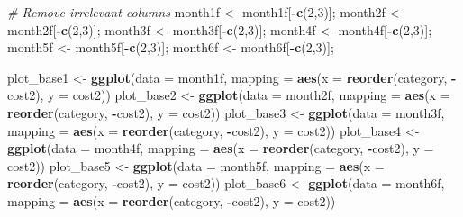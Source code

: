 \documentclass[
]{article}
\newenvironment{Shaded}{\begin{snugshade}}{\end{snugshade}}
\newcommand{\CommentTok}[1]{\textcolor[rgb]{0.56,0.35,0.01}{\textit{#1}}}
\newcommand{\DataTypeTok}[1]{\textcolor[rgb]{0.13,0.29,0.53}{#1}}
\newcommand{\DecValTok}[1]{\textcolor[rgb]{0.00,0.00,0.81}{#1}}
\newcommand{\KeywordTok}[1]{\textcolor[rgb]{0.13,0.29,0.53}{\textbf{#1}}}
\newcommand{\NormalTok}[1]{#1}
\newcommand{\OperatorTok}[1]{\textcolor[rgb]{0.81,0.36,0.00}{\textbf{#1}}}
\newcommand{\StringTok}[1]{\textcolor[rgb]{0.31,0.60,0.02}{#1}}
\begin{document}
\begin{Shaded}
\begin{Highlighting}[]
\CommentTok{# Remove irrelevant columns}
\NormalTok{ month1f <-}\StringTok{ }\NormalTok{month1f[}\OperatorTok{-}\KeywordTok{c}\NormalTok{(}\DecValTok{2}\NormalTok{,}\DecValTok{3}\NormalTok{)];}
\NormalTok{ month2f <-}\StringTok{ }\NormalTok{month2f[}\OperatorTok{-}\KeywordTok{c}\NormalTok{(}\DecValTok{2}\NormalTok{,}\DecValTok{3}\NormalTok{)];}
\NormalTok{ month3f <-}\StringTok{ }\NormalTok{month3f[}\OperatorTok{-}\KeywordTok{c}\NormalTok{(}\DecValTok{2}\NormalTok{,}\DecValTok{3}\NormalTok{)];}
\NormalTok{ month4f <-}\StringTok{ }\NormalTok{month4f[}\OperatorTok{-}\KeywordTok{c}\NormalTok{(}\DecValTok{2}\NormalTok{,}\DecValTok{3}\NormalTok{)];}
\NormalTok{ month5f <-}\StringTok{ }\NormalTok{month5f[}\OperatorTok{-}\KeywordTok{c}\NormalTok{(}\DecValTok{2}\NormalTok{,}\DecValTok{3}\NormalTok{)];}
\NormalTok{ month6f <-}\StringTok{ }\NormalTok{month6f[}\OperatorTok{-}\KeywordTok{c}\NormalTok{(}\DecValTok{2}\NormalTok{,}\DecValTok{3}\NormalTok{)];}
 
\NormalTok{ plot_base1 <-}\StringTok{ }\KeywordTok{ggplot}\NormalTok{(}\DataTypeTok{data =}\NormalTok{ month1f, }\DataTypeTok{mapping =} \KeywordTok{aes}\NormalTok{(}\DataTypeTok{x =} \KeywordTok{reorder}\NormalTok{(category, }\OperatorTok{-}\NormalTok{cost2), }\DataTypeTok{y =}\NormalTok{ cost2))}
\NormalTok{ plot_base2 <-}\StringTok{ }\KeywordTok{ggplot}\NormalTok{(}\DataTypeTok{data =}\NormalTok{ month2f, }\DataTypeTok{mapping =} \KeywordTok{aes}\NormalTok{(}\DataTypeTok{x =} \KeywordTok{reorder}\NormalTok{(category, }\OperatorTok{-}\NormalTok{cost2), }\DataTypeTok{y =}\NormalTok{ cost2))}
\NormalTok{ plot_base3 <-}\StringTok{ }\KeywordTok{ggplot}\NormalTok{(}\DataTypeTok{data =}\NormalTok{ month3f, }\DataTypeTok{mapping =} \KeywordTok{aes}\NormalTok{(}\DataTypeTok{x =} \KeywordTok{reorder}\NormalTok{(category, }\OperatorTok{-}\NormalTok{cost2), }\DataTypeTok{y =}\NormalTok{ cost2))}
\NormalTok{ plot_base4 <-}\StringTok{ }\KeywordTok{ggplot}\NormalTok{(}\DataTypeTok{data =}\NormalTok{ month4f, }\DataTypeTok{mapping =} \KeywordTok{aes}\NormalTok{(}\DataTypeTok{x =} \KeywordTok{reorder}\NormalTok{(category, }\OperatorTok{-}\NormalTok{cost2), }\DataTypeTok{y =}\NormalTok{ cost2))}
\NormalTok{ plot_base5 <-}\StringTok{ }\KeywordTok{ggplot}\NormalTok{(}\DataTypeTok{data =}\NormalTok{ month5f, }\DataTypeTok{mapping =} \KeywordTok{aes}\NormalTok{(}\DataTypeTok{x =} \KeywordTok{reorder}\NormalTok{(category, }\OperatorTok{-}\NormalTok{cost2), }\DataTypeTok{y =}\NormalTok{ cost2))}
\NormalTok{ plot_base6 <-}\StringTok{ }\KeywordTok{ggplot}\NormalTok{(}\DataTypeTok{data =}\NormalTok{ month6f, }\DataTypeTok{mapping =} \KeywordTok{aes}\NormalTok{(}\DataTypeTok{x =} \KeywordTok{reorder}\NormalTok{(category, }\OperatorTok{-}\NormalTok{cost2), }\DataTypeTok{y =}\NormalTok{ cost2))}


\end{Highlighting}
\end{Shaded}
\end{document}
